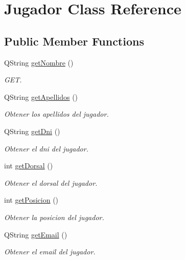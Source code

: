 \hypertarget{classJugador}{}\section{Jugador Class Reference}
\label{classJugador}
\subsection*{Public Member Functions}
\begin{DoxyCompactItemize}
\item 
Q\+String \mbox{\hyperlink{classJugador_a326995f44b24a9a5247144868f2ba359}{get\+Nombre}} ()
\begin{DoxyCompactList}\small\item\em G\+ET. \end{DoxyCompactList}\item 
Q\+String \mbox{\hyperlink{classJugador_aba79aff8e870ffe04bf5a4ffd94f5e5d}{get\+Apellidos}} ()
\begin{DoxyCompactList}\small\item\em Obtener los apellidos del jugador. \end{DoxyCompactList}\item 
Q\+String \mbox{\hyperlink{classJugador_abd65250f237f645c3f926e879b4740dd}{get\+Dni}} ()
\begin{DoxyCompactList}\small\item\em Obtener el dni del jugador. \end{DoxyCompactList}\item 
int \mbox{\hyperlink{classJugador_a7f67a27c34f24e618cdbfbebf29b8704}{get\+Dorsal}} ()
\begin{DoxyCompactList}\small\item\em Obtener el dorsal del jugador. \end{DoxyCompactList}\item 
int \mbox{\hyperlink{classJugador_afd85bc493fbd7626cdee30d9a2e18fd2}{get\+Posicion}} ()
\begin{DoxyCompactList}\small\item\em Obtener la posicion del jugador. \end{DoxyCompactList}\item 
Q\+String \mbox{\hyperlink{classJugador_ac70026da85dea7d05eaaf8df72c4e8eb}{get\+Email}} ()
\begin{DoxyCompactList}\small\item\em Obtener el email del jugador. \end{DoxyCompactList}\item 

\end{DoxyCompactItemize}
